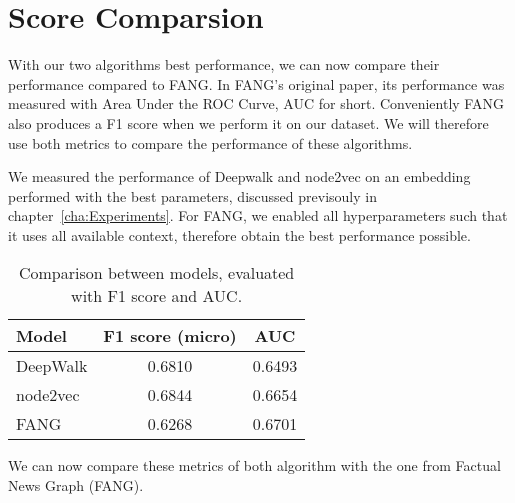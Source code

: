 \newpage
\section{Score Comparsion}

With our two algorithms best performance, we can now compare their performance compared to FANG.
In FANG's original paper, its performance was measured with Area Under the ROC Curve, AUC for short.
Conveniently FANG also produces a F1 score when we perform it on our dataset.
We will therefore use both metrics to compare the performance of these algorithms.

We measured the performance of Deepwalk and node2vec on an embedding performed with the best parameters, discussed previsouly in chapter~\ref{cha:Experiments}.
For FANG, we enabled all hyperparameters such that it uses all available context, therefore obtain the best performance possible.

\begin{table}[h]
    \centering
    \caption{Comparison between models, evaluated with F1 score and AUC.}
    \label{tab:f1_auc}
    \begin{tabular}{lcc}
        \toprule
        Model & F1 score (micro) & AUC \\
        \midrule
        DeepWalk & 0.6810 & 0.6493 \\
        node2vec & 0.6844 & 0.6654 \\
        FANG & 0.6268 & 0.6701 \\
        \bottomrule
    \end{tabular}
\end{table}
We can now compare these metrics of both algorithm with the one from Factual News Graph (FANG).

\iffalse
\subsubsection{Notes}

Just like Deepwalk and node2vec, FANG produces both F1 score and AUC using the sklearn library.
The AUC uses the default ($average=macro$).

However the F1 produced uses $average=binary$.
We have F1 micro and macro score for DeepWalk and node2vec.
Which one should we use, or do we need to run the program with binary F1?



\fi

